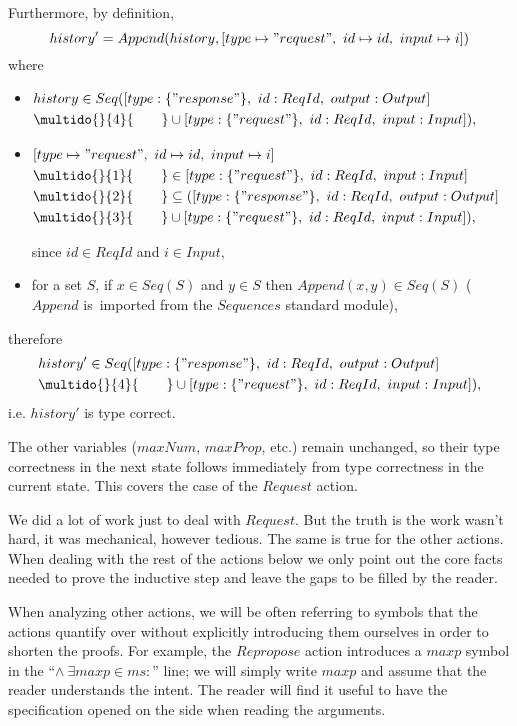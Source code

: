 \documentclass[12pt,a4paper,en]{pracamgr}
\newcommand{\ind}[1]{\multido{}{#1}{\qquad}}
\begin{document}
Furthermore, by definition,
$$ history' = Append(history, [type \mapsto "request",\ id \mapsto id,\ input \mapsto i]) $$
where
\begin{itemize}
    \item $ \begin{aligned}[t]
          & history \in Seq([type: \{"response"\},\ id: ReqId,\ output: Output]\\
          & \ind{4}\cup [type: \{"request"\},\ id: ReqId,\ input: Input]),
        \end{aligned}$
    \item $\begin{aligned}[t]
            & [type \mapsto "request",\ id \mapsto id,\ input \mapsto i]\\
            & \ind{1} \in [type: \{"request"\},\ id: ReqId,\ input: Input]\\
            & \ind{2} \subseteq ([type: \{"response"\},\ id: ReqId,\ output: Output]\\
            & \ind{3} \cup [type: \{"request"\},\ id: ReqId,\ input: Input]),
    \end{aligned}$

        since $id \in ReqId$ and $i \in Input$,
\item for a set $S$, if $x \in Seq(S)$ and $y \in S$ then $Append(x, y) \in Seq(S)$ ($Append$ is~imported from the $Sequences$ standard module),
\end{itemize}
therefore
\begin{align*}
& history' \in Seq([type: \{"response"\},\ id: ReqId,\ output: Output]\\
& \ind{4}\cup [type: \{"request"\},\ id: ReqId,\ input: Input]),
\end{align*}
i.e. $history'$ is type correct.

The other variables ($maxNum$, $maxProp$, etc.) remain unchanged, so their type correctness in the next state follows immediately from type correctness in the current state. This covers the case of the $Request$ action.

We did a lot of work just to deal with $Request$. But the truth is the work wasn't hard, it was mechanical, however tedious. The same is true for the other actions. When dealing with the rest of the actions below we only point out the core facts needed to prove the inductive step and leave the gaps to be filled by the reader.

When analyzing other actions, we will be often referring to symbols that the actions quantify over without explicitly introducing them ourselves in order to shorten the proofs. For example, the $Repropose$ action introduces a $maxp$ symbol in the ``$\land\ \exists maxp \in ms:$'' line; we will simply write $maxp$ and assume that the reader understands the intent. The reader will find it useful to have the specification opened on the side when reading the arguments.
\end{document}
